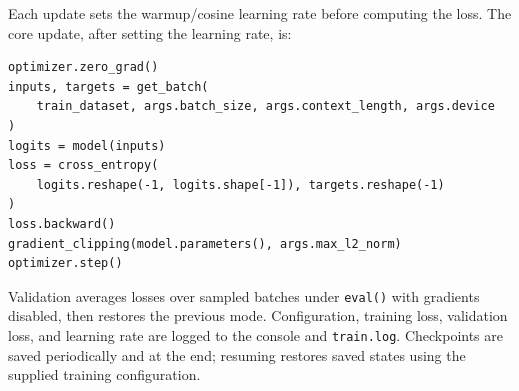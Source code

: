 Each update sets the warmup/cosine learning rate before computing the loss.
The core update, after setting the learning rate, is:
\par\noindent
\begin{minipage}{\linewidth}
\begin{lstlisting}[caption={Training update}]
optimizer.zero_grad()
inputs, targets = get_batch(
    train_dataset, args.batch_size, args.context_length, args.device
)
logits = model(inputs)
loss = cross_entropy(
    logits.reshape(-1, logits.shape[-1]), targets.reshape(-1)
)
loss.backward()
gradient_clipping(model.parameters(), args.max_l2_norm)
optimizer.step()
\end{lstlisting}
\end{minipage}\par
Validation averages losses over sampled batches under \texttt{eval()} with
gradients disabled, then restores the previous mode. Configuration, training
loss, validation loss, and learning rate are logged to the console and
\texttt{train.log}. Checkpoints are saved periodically and at the end;
resuming restores saved states using the supplied training configuration.


